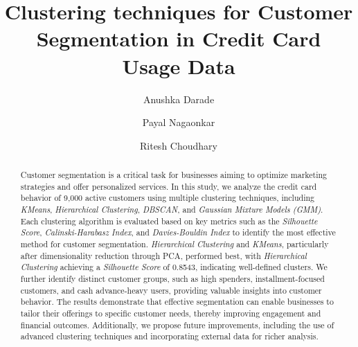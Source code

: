 \documentclass[runningheads,a4paper]{llncs}
\begin{document}
\mainmatter  %

\title{Clustering techniques for Customer Segmentation in Credit Card Usage Data}



\author{Anushka Darade \and Payal Nagaonkar \and Ritesh Choudhary }




\maketitle

\begin{abstract}
Customer segmentation is a critical task for businesses aiming to optimize marketing strategies and offer personalized services. In this study, we analyze the credit card behavior of 9,000 active customers using multiple clustering techniques, including \textit{KMeans}, \textit{Hierarchical Clustering}, \textit{DBSCAN}, and \textit{Gaussian Mixture Models (GMM)}. Each clustering algorithm is evaluated based on key metrics such as the \textit{Silhouette Score}, \textit{Calinski-Harabasz Index}, and \textit{Davies-Bouldin Index} to identify the most effective method for customer segmentation. \textit{Hierarchical Clustering} and \textit{KMeans}, particularly after dimensionality reduction through PCA, performed best, with \textit{Hierarchical Clustering} achieving a \textit{Silhouette Score} of 0.8543, indicating well-defined clusters. We further identify distinct customer groups, such as high spenders, installment-focused customers, and cash advance-heavy users, providing valuable insights into customer behavior. The results demonstrate that effective segmentation can enable businesses to tailor their offerings to specific customer needs, thereby improving engagement and financial outcomes. Additionally, we propose future improvements, including the use of advanced clustering techniques and incorporating external data for richer analysis.

\end{abstract}
\end{document}
